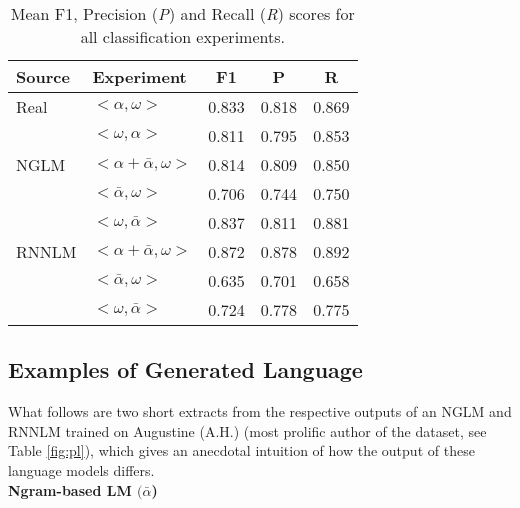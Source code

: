 \documentclass[11pt]{article}
\begin{document}
\begin{table}
	\hskip-0.5cm\begin{tabular}{llccc}
	\toprule
	Source & Experiment & F1 & P & R \\
	\midrule
	Real & $<\alpha,\omega>$ &  0.833 &      0.818 &   0.869 \\
   	  	 & $<\omega,\alpha>$ &  0.811 &      0.795 &   0.853 \\
	NGLM & $<\alpha+\bar{\alpha},\omega>$ &  0.814 &      0.809 &   0.850 \\
    	  & $<\bar{\alpha},\omega>$ &  0.706 &      0.744 &   0.750 \\
     	  & $<\omega,\bar{\alpha}>$ &  0.837 &      0.811 &   0.881 \\
	RNNLM & $<\alpha+\bar{\alpha},\omega>$ &  0.872 &      0.878 &   0.892 \\
        & $<\bar{\alpha},\omega>$ &  0.635 &      0.701 &   0.658 \\
        & $<\omega,\bar{\alpha}>$ &  0.724 &      0.778 &   0.775 \\
	\bottomrule
   
	\end{tabular}
\caption{\label{tab:results}
	Mean F1, Precision (\emph{P}) and Recall (\emph{R}) scores for all classification experiments.
}
\end{table}

\subsection{Examples of Generated Language}
What follows are two short extracts from the respective outputs of an NGLM and RNNLM trained on Augustine (A.H.) (most prolific author of the dataset, see Table \ref{fig:pl}), which gives an anecdotal intuition of how the output of these language models differs.\\

\noindent \textbf{Ngram-based LM $(\bar{\alpha}$)}
\begin{exe}
\end{exe}
\end{document}
